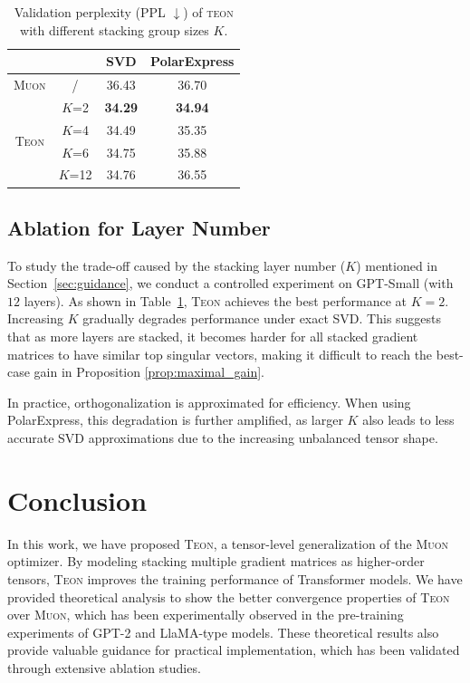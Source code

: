 \documentclass{article}
\theoremstyle{plain}
\theoremstyle{definition}
\theoremstyle{remark}
\begin{document}
\begin{table}[t]
  \centering
  \small
        \begin{tabular}{cccc}
        \toprule
              &       & SVD   & PolarExpress \\
        \midrule
        \textsc{Muon}  & /     & 36.43 & 36.70 \\
        \midrule
        \multirow{4}[8]{*}{\textsc{Teon}} & $K$=2   & \textbf{34.29} & \textbf{34.94} \\
        \cmidrule{2-4}      & $K$=4   & 34.49 & 35.35 \\
        \cmidrule{2-4}      & $K$=6   & 34.75 & 35.88 \\
        \cmidrule{2-4}      & $K$=12  & 34.76 & 36.55 \\
        \bottomrule
        \end{tabular}%
  \caption{Validation perplexity (PPL $\downarrow$) of \textsc{teon} with different stacking group sizes $K$.}
  \label{tab:Teon L}%
  \vspace{-10pt}
\end{table}%

\subsection{Ablation for Layer Number}

\label{sec:ablation_layer_number}
\vspace{-2pt}
To study the trade-off caused by the stacking layer number ($K$) mentioned in Section~\ref{sec:guidance}, we conduct a controlled experiment on GPT-Small (with $12$ layers). As shown in Table~\ref{tab:Teon L}, \textsc{Teon} achieves the best performance at $K = 2$. Increasing $K$ gradually degrades performance under exact SVD. This suggests that as more layers are stacked, it becomes harder for all stacked gradient matrices to have similar top singular vectors, making it difficult to reach the best-case gain in Proposition \ref{prop:maximal_gain}.

\vspace{-2pt}
In practice, orthogonalization is approximated for efficiency. When using PolarExpress, this degradation is further amplified, as larger $K$ also leads to less accurate SVD approximations due to the increasing unbalanced tensor shape.

\section{Conclusion}
In this work, we have proposed \textsc{Teon}, a tensor-level generalization of the \textsc{Muon} optimizer. By modeling stacking multiple gradient matrices as higher-order tensors, \textsc{Teon} improves the training performance of Transformer models. We have provided theoretical analysis to show the better convergence properties of \textsc{Teon} over \textsc{Muon}, which has been experimentally observed in the pre-training experiments of GPT-2 and LlaMA-type models. These theoretical results also provide valuable guidance for practical implementation, which has been validated through extensive ablation studies.
\end{document}
